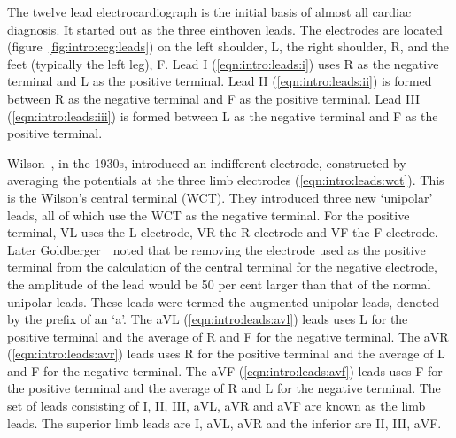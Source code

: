 The twelve lead electrocardiograph is the initial basis of almost all cardiac
diagnosis.
It started out as the three einthoven leads.
The electrodes are located (figure~\ref{fig:intro:ecg:leads}) on the left
shoulder, L, the right shoulder, R, and the feet (typically the left leg), F.
Lead I (\ref{eqn:intro:leads:i}) uses R as the negative terminal and L as the
positive terminal.
Lead II (\ref{eqn:intro:leads:ii}) is formed between R as the negative terminal
and F as the positive terminal.
Lead III (\ref{eqn:intro:leads:iii}) is formed between L as the negative terminal
and F as the positive terminal.

Wilson~\cite{Wilson1934}, in the 1930s, introduced an indifferent
electrode,  constructed by averaging the potentials at the three limb
electrodes (\ref{eqn:intro:leads:wct}).
This is the Wilson's central terminal (WCT).
They introduced three new `unipolar' leads, all of which use the WCT as the
negative terminal.
For the positive terminal, VL uses the L electrode, VR the R electrode and VF
the F electrode.
Later Goldberger~\cite{Goldberger1942}\ noted that be removing the electrode used
as the positive terminal from the calculation of the central terminal for the
negative electrode, the amplitude of the lead would be 50 per cent larger than
that of the normal unipolar leads.
These leads were termed the augmented unipolar leads, denoted by the prefix of
an `a'.
The aVL (\ref{eqn:intro:leads:avl}) leads uses L for the positive terminal and
the average of R and F for the negative terminal.
The aVR (\ref{eqn:intro:leads:avr}) leads uses R for the positive terminal and
the average of L and F for the negative terminal.
The aVF (\ref{eqn:intro:leads:avf}) leads uses F for the positive terminal and
the average of R and L for the negative terminal.
The set of leads consisting of I, II, III, aVL, aVR and aVF are known as the
limb leads.
The superior limb leads are I, aVL, aVR and the inferior are II, III, aVF.

